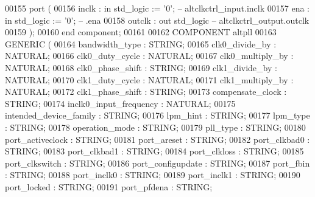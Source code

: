 \begin{DoxyCode}
00155    \textcolor{keywordflow}{port} (
00156       inclk  : \textcolor{keywordflow}{in}  \textcolor{comment}{std\_logic} := '\textcolor{vhdllogic}{}\textcolor{vhdllogic}{0}'; \textcolor{keyword}{--  altclkctrl\_input.inclk}
00157       ena    : \textcolor{keywordflow}{in}  \textcolor{comment}{std\_logic} := '\textcolor{vhdllogic}{}\textcolor{vhdllogic}{0}'; \textcolor{keyword}{--                  .ena}
00158       outclk : \textcolor{keywordflow}{out} \textcolor{comment}{std\_logic}\textcolor{keyword}{         -- altclkctrl\_output.outclk}
00159 );
00160 \textcolor{keywordflow}{end} \textcolor{keywordflow}{component};
00161 
00162 \textcolor{keywordflow}{COMPONENT} altpll
00163    \textcolor{keywordflow}{GENERIC} (
00164       bandwidth\_type          : \textcolor{comment}{STRING};
00165       clk0\_divide\_by          : \textcolor{comment}{NATURAL};
00166       clk0\_duty\_cycle         : \textcolor{comment}{NATURAL};
00167       clk0\_multiply\_by        : \textcolor{comment}{NATURAL};
00168       clk0\_phase\_shift        : \textcolor{comment}{STRING};
00169       clk1\_divide\_by          : \textcolor{comment}{NATURAL};
00170       clk1\_duty\_cycle         : \textcolor{comment}{NATURAL};
00171       clk1\_multiply\_by        : \textcolor{comment}{NATURAL};
00172       clk1\_phase\_shift        : \textcolor{comment}{STRING};
00173       compensate\_clock        : \textcolor{comment}{STRING};
00174       inclk0\_input\_frequency  : \textcolor{comment}{NATURAL};
00175       intended\_device\_family  : \textcolor{comment}{STRING};
00176       lpm\_hint                : \textcolor{comment}{STRING};
00177       lpm\_type                : \textcolor{comment}{STRING};
00178       operation\_mode          : \textcolor{comment}{STRING};
00179       pll\_type                : \textcolor{comment}{STRING};
00180       port\_activeclock        : \textcolor{comment}{STRING};
00181       port\_areset             : \textcolor{comment}{STRING};
00182       port\_clkbad0            : \textcolor{comment}{STRING};
00183       port\_clkbad1            : \textcolor{comment}{STRING};
00184       port\_clkloss            : \textcolor{comment}{STRING};
00185       port\_clkswitch          : \textcolor{comment}{STRING};
00186       port\_configupdate       : \textcolor{comment}{STRING};
00187       port\_fbin               : \textcolor{comment}{STRING};
00188       port\_inclk0             : \textcolor{comment}{STRING};
00189       port\_inclk1             : \textcolor{comment}{STRING};
00190       port\_locked             : \textcolor{comment}{STRING};
00191       port\_pfdena             : \textcolor{comment}{STRING};

\end{DoxyCode}
